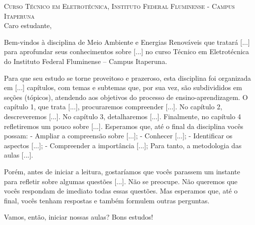 \noindent \textsc{Curso Técnico em Eletrotécnica, Instituto Federal Fluminense - Campus Itaperuna}\\

\noindent 
Caro estudante,

Bem-vindos à disciplina de Meio Ambiente e Energias Renováveis que tratará [...] para aprofundar seus conhecimentos sobre [...] no curso Técnico em Eletrotécnica do Instituto Federal Fluminense – Campus Itaperuna.

Para que seu estudo se torne proveitoso e prazeroso, esta disciplina foi organizada em [...] capítulos, com temas e subtemas que, por sua vez, são subdivididos em seções (tópicos), atendendo aos objetivos do processo de ensino-aprendizagem.
O capítulo 1, que trata [...], procuraremos compreender [...].  No capítulo 2, descreveremos
[...]. No capítulo 3, detalharemos [...]. Finalmente, no capítulo 4 refletiremos um pouco sobre [...]. Esperamos que, até o final da disciplina vocês possam:
- Ampliar a compreensão sobre [...];
- Conhecer [...];
- Identificar os aspectos [...];
- Compreender a importância [...];
Para tanto, a metodologia das aulas [...].

Porém, antes de iniciar a leitura, gostaríamos que vocês parassem um instante para refletir sobre algumas questões [...].
Não se preocupe.  Não queremos que vocês respondam de imediato todas essas questões.  Mas esperamos que, até o final, vocês tenham respostas e também formulem outras perguntas.

Vamos, então, iniciar nossas aulas? Bons estudos!

